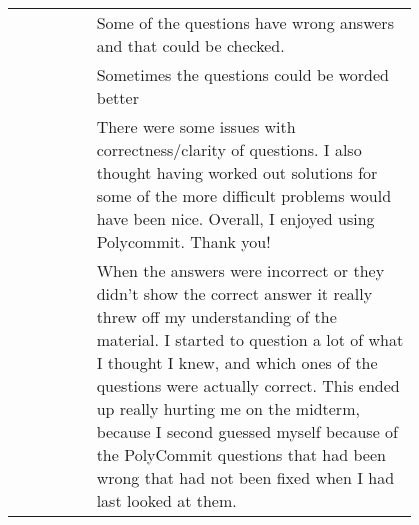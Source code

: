 {\begin{longtable}{R|p{0.8\linewidth}}
		& Some of the questions have wrong answers and that could be checked.                                                                                                                                                                                                                                                                                                                                                                                                                                                                                                                                                                                                                                                                              \\
		& Sometimes the questions could be worded better                                                                                                                                                                                                                                                                                                                                                                                                                                                                                                                                                                                                                                                                                                   \\
		& There were some issues with correctness/clarity of questions. I also thought having worked out solutions for some of the more difficult problems would have been nice. Overall, I enjoyed using Polycommit. Thank you!                                                                                                                                                                                                                                                                                                                                                                                                                                                                                                                           \\
		& When the answers were incorrect or they didn't show the correct answer it really threw off my understanding of the material. I started to question a lot of what I thought I knew, and which ones of the questions were actually correct. This ended up really hurting me on the midterm, because I second guessed myself because of the PolyCommit questions that had been wrong that had not been fixed when I had last looked at them.                                                                                                                                                                                                                                                                                                        \\

\end{longtable}}
